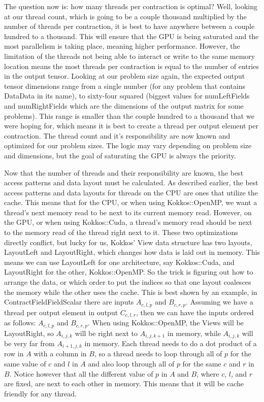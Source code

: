 The question now is: how many threads per contraction is optimal? Well, looking at our thread count, which is going to be a couple thousand multiplied by the number of threads per contraction, it is best to have anywhere between a couple hundred to a thousand. This will ensure that the GPU is being saturated and the most parallelism is taking place, meaning higher performance. However, the limitation of the threads not being able to interact or write to the same memory location means the most threads per contraction is equal to the number of entries in the output tensor. Looking at our problem size again, the expected output tensor dimensions range from a single number (for any problem that contains DataData in its name), to sixty-four squared (biggest values for numLeftFields and numRightFields which are the dimensions of the output matrix for some problems). This range is smaller than the couple hundred to a thousand that we were hoping for, which means it is best to create a thread per output element per contraction. The thread count and it's responsibility are now known and optimized for our problem sizes. The logic may vary depending on problem size and dimensions, but the goal of saturating the GPU is always the priority.

Now that the number of threads and their responsibility are known, the best access patterns and data layout must be calculated. As described earlier, the best access patterns and data layouts for threads on the CPU are ones that utilize the cache. This means that for the CPU, or when using Kokkos::OpenMP, we want a thread's next memory read to be next to its current memory read. However, on the GPU, or when using Kokkos::Cuda, a thread's memory read should be next to the memory read of the thread right next to it. These two optimizations directly conflict, but lucky for us, Kokkos' View data structure has two layouts, LayoutLeft and LayoutRight, which changes how data is laid out in memory. This means we can use LayoutLeft for one architecture, say Kokkos::Cuda, and LayoutRight for the other, Kokkos::OpenMP. So the trick is figuring out how to arrange the data, or which order to put the indices so that one layout coalesces the memory while the other uses the cache. This is best shown by an example, in ContractFieldFieldScalar there are inputs $A_{c, l, p}$ and $B_{c, r, p}$. Assuming we have a thread per output element in output $C_{c, l, r}$, then we can have the inputs ordered as follows: $A_{c, l, p}$ and $B_{c, r, p}$. When using Kokkos::OpenMP, the Views will be LayoutRight, so $A_{i, j, k}$ will be right next to $A_{i, j, k+1}$ in memory, while $A_{i, j, k}$ will be very far from $A_{i+1, j, k}$ in memory. Each thread needs to do a dot product of a row in $A$ with a column in $B$, so a thread needs to loop through all of $p$ for the same value of $c$ and $l$ in $A$ and also loop through all of $p$ for the same $c$ and $r$ in $B$. Notice however that all the different value of $p$ in $A$ and $B$, where $c$, $l$, and $r$ are fixed, are next to each other in memory. This means that it will be cache friendly for any thread. 

